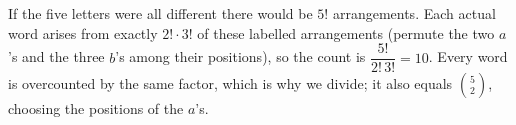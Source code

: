If the five letters were all different there would be $5!$ arrangements. Each actual word arises from exactly $2!\cdot3!$ of these labelled arrangements (permute the two $a$'s and the three $b$'s among their positions), so the count is $\dfrac{5!}{2!\,3!}=\boxed{10}$. Every word is overcounted by the same factor, which is why we divide; it also equals $\binom52$, choosing the positions of the $a$'s.
